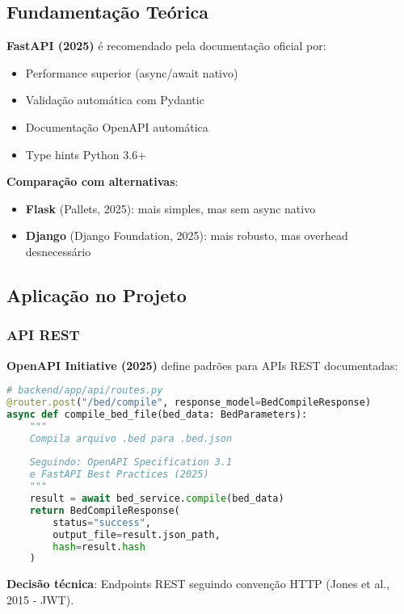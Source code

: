 \documentclass[12pt,a4paper]{article}
\begin{document}
\subsection{Fundamentação Teórica}

\textbf{FastAPI (2025)} é recomendado pela documentação oficial por:
\begin{itemize}
    \item Performance superior (async/await nativo)
    \item Validação automática com Pydantic
    \item Documentação OpenAPI automática
    \item Type hints Python 3.6+
\end{itemize}

\textbf{Comparação com alternativas}:
\begin{itemize}
    \item \textbf{Flask} (Pallets, 2025): mais simples, mas sem async nativo
    \item \textbf{Django} (Django Foundation, 2025): mais robusto, mas overhead desnecessário
\end{itemize}

\subsection{Aplicação no Projeto}

\subsubsection{API REST}

\textbf{OpenAPI Initiative (2025)} define padrões para APIs REST documentadas:

\begin{lstlisting}[language=Python, caption=Endpoint REST com FastAPI]
# backend/app/api/routes.py
@router.post("/bed/compile", response_model=BedCompileResponse)
async def compile_bed_file(bed_data: BedParameters):
    """
    Compila arquivo .bed para .bed.json
    
    Seguindo: OpenAPI Specification 3.1
    e FastAPI Best Practices (2025)
    """
    result = await bed_service.compile(bed_data)
    return BedCompileResponse(
        status="success",
        output_file=result.json_path,
        hash=result.hash
    )
\end{lstlisting}

\textbf{Decisão técnica}: Endpoints REST seguindo convenção HTTP (Jones et al., 2015 - JWT).
\end{document}
